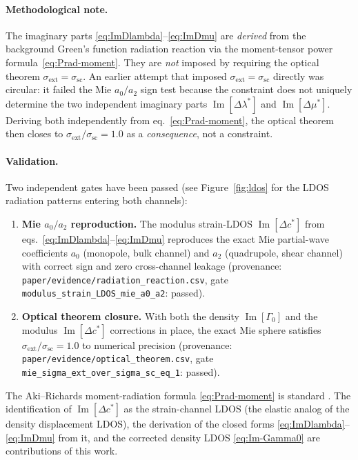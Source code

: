 \documentclass[11pt,a4paper]{article}
\newcommand{\D}{\Delta}
\theoremstyle{plain}
\theoremstyle{definition}
\theoremstyle{remark}
\begin{document}
\paragraph{Methodological note.}
The imaginary parts \eqref{eq:ImDlambda}--\eqref{eq:ImDmu} are
\emph{derived} from the background Green's function radiation reaction
via the moment-tensor power formula~\eqref{eq:Prad-moment}.  They are
\emph{not} imposed by requiring the optical theorem $\sigma_\mathrm{ext} =
\sigma_\mathrm{sc}$.  An earlier attempt that imposed $\sigma_\mathrm{ext} =
\sigma_\mathrm{sc}$ directly was circular: it failed the Mie $a_0/a_2$ sign
test because the constraint does not uniquely determine the two independent
imaginary parts $\operatorname{Im}[\D\lambda^*]$ and
$\operatorname{Im}[\D\mu^*]$.  Deriving both independently from
eq.~\eqref{eq:Prad-moment}, the optical theorem then closes to
$\sigma_\mathrm{ext}/\sigma_\mathrm{sc} = 1.0$ as a \emph{consequence},
not a constraint.

\paragraph{Validation.}
Two independent gates have been passed (see Figure~\ref{fig:ldos} for the
LDOS radiation patterns entering both channels):
\begin{enumerate}[leftmargin=2em]
  \item \textbf{Mie $a_0/a_2$ reproduction.}  The modulus strain-LDOS
    $\operatorname{Im}[\D c^*]$ from
    eqs.~\eqref{eq:ImDlambda}--\eqref{eq:ImDmu} reproduces the exact Mie
    partial-wave coefficients $a_0$ (monopole, bulk channel) and $a_2$
    (quadrupole, shear channel) with correct sign and zero cross-channel
    leakage (provenance: \texttt{paper/evidence/radiation\_reaction.csv},
    gate \texttt{modulus\_strain\_LDOS\_mie\_a0\_a2}: passed).
  \item \textbf{Optical theorem closure.}  With both the density
    $\operatorname{Im}[\Gamma_0]$ and the modulus
    $\operatorname{Im}[\D c^*]$ corrections in place, the exact Mie sphere
    satisfies $\sigma_\mathrm{ext}/\sigma_\mathrm{sc} = 1.0$ to numerical
    precision (provenance: \texttt{paper/evidence/optical\_theorem.csv},
    gate \texttt{mie\_sigma\_ext\_over\_sigma\_sc\_eq\_1}: passed).
\end{enumerate}

The Aki--Richards moment-radiation formula \eqref{eq:Prad-moment} is
standard \cite{akirichards2002}.  The identification of
$\operatorname{Im}[\D c^*]$ as the strain-channel LDOS (the elastic analog
of the density displacement LDOS), the derivation of the closed forms
\eqref{eq:ImDlambda}--\eqref{eq:ImDmu} from it, and the corrected density
LDOS \eqref{eq:Im-Gamma0} are contributions of this work.
\end{document}
